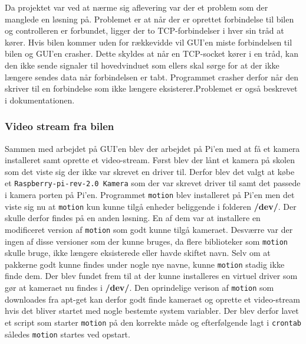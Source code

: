 Da projektet var ved at nærme sig aflevering var der et problem som der manglede en løsning på. Problemet er at når der er oprettet forbindelse til bilen og controlleren er forbundet, ligger der to TCP-forbindelser i hver sin tråd at kører. Hvis bilen kommer uden for rækkevidde vil GUI’en miste forbindelsen til bilen og GUI’en crasher. Dette skyldes at når en TCP-socket kører i en tråd, kan den ikke sende signaler til hovedvinduet som ellers skal sørge for at der ikke længere sendes data når forbindelsen er tabt. Programmet crasher derfor når den skriver til en forbindelse som ikke længere eksisterer.Problemet er også beskrevet i dokumentationen. 

\subsubsection{Video stream fra bilen}
Sammen med arbejdet på GUI’en blev der arbejdet på Pi’en med at få et kamera installeret samt oprette et video-stream. Først blev der lånt et kamera på skolen som det viste sig der ikke var skrevet en driver til. Derfor blev det valgt at købe et \texttt{Raspberry-pi-rev-2.0 Kamera} som der var skrevet driver til samt det passede i kamera porten på Pi’en. Programmet \texttt{motion} blev installeret på Pi’en men det viste sig nu at \texttt{motion} kun kunne tilgå enheder beliggende i folderen \textbf{\//dev/}. Der skulle derfor findes på en anden løsning. En af dem var at installere en modificeret version af \texttt{motion} \cite{lib:motion-on-raspberry} som godt kunne tilgå kameraet. Desværre var der ingen af disse versioner som der kunne bruges, da flere biblioteker som \texttt{motion} skulle bruge, ikke længere eksisterede eller havde skiftet navn. Selv om at pakkerne godt kunne findes under nogle nye navne, kunne \texttt{motion} stadig ikke finde dem. Der blev fundet frem til at der kunne installeres en virtuel driver \cite{lib:camera-driver} som gør at kameraet nu findes i \textbf{\//dev/}. Den oprindelige verison af \texttt{motion} som downloades fra apt-get kan derfor godt finde kameraet og oprette et video-stream hvis det bliver startet med nogle bestemte system variabler. Der blev derfor lavet et script som starter \texttt{motion} på den korrekte måde og efterfølgende lagt i \texttt{crontab} således \texttt{motion} startes ved opstart. 

\clearpage